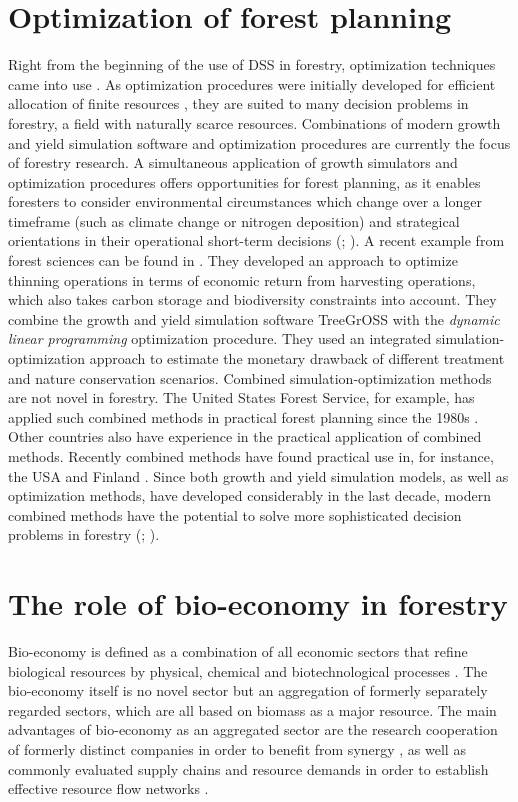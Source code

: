 \section{Optimization of forest planning}
\label{sec:intro:opt}
Right from the beginning of the use of DSS in forestry, optimization techniques came into use \citep[p. 16]{kangas_2015}. As optimization procedures were initially developed for efficient allocation of finite resources \citep[p. 271]{davis_2001}, they are suited to many decision problems in forestry, a field with naturally scarce resources. Combinations of modern growth and yield simulation software and optimization procedures are currently the focus of forestry research. A simultaneous application of growth simulators and optimization procedures offers opportunities for forest planning, as it enables foresters to consider environmental circumstances which change over a longer timeframe (such as climate change or nitrogen deposition) and strategical orientations in their operational short-term decisions (\citealp[p. 346-347]{mohring_2010}; \citealp[p. 1081]{pretzsch_2008}). A recent example from forest sciences can be found in \citet{yousefpour_2009}. They developed an approach to optimize thinning operations in terms of economic return from harvesting operations, which also takes carbon storage and biodiversity constraints into account. They combine the growth and yield simulation software TreeGrOSS with the \textit{dynamic linear programming} optimization procedure. They used an integrated si\-mu\-la\-tion-op\-ti\-mi\-za\-tion approach to estimate the monetary drawback of different treatment and nature conservation scenarios. Combined si\-mu\-la\-tion-op\-ti\-mi\-za\-tion methods are not novel in forestry. The United States Forest Service, for example, has applied such combined methods in practical forest planning since the 1980s \citep[p. 33]{hoganson_2015}. Other countries also have experience in the practical application of combined methods. Recently combined methods have found practical use in, for instance, the USA and Finland \citep[p. 41]{hoganson_2015}. Since both growth and yield simulation models, as well as optimization methods, have developed considerably in the last decade, modern combined methods have the potential to solve more sophisticated decision problems in forestry (\citealp[p. 16-17]{kangas_2015}; \citealp[p. 93]{muys_2010}).

\section{The role of bio-economy in forestry}
\label{sec:intro:biecon}
Bio-economy is defined as a combination of all economic sectors that refine biological resources by physical, chemical and biotechnological processes \citep[p. 10462]{debesi_2015}. The bio-economy itself is no novel sector but an aggregation of formerly separately regarded sectors, which are all based on biomass as a major resource. The main advantages of bio-economy as an aggregated sector are the research cooperation of formerly distinct companies in order to benefit from synergy \citep[p. 1]{auer_2016}, as well as commonly evaluated supply chains and resource demands in order to establish effective resource flow networks \citep[p. 3]{geldermann_2016}.

